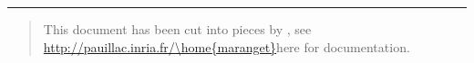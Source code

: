 \hrule
\begin{quote}
This document has been cut into pieces by \htmlcut, see
\url{http://pauillac.inria.fr/\home{maranget}}{here} for documentation.
\end{quote}